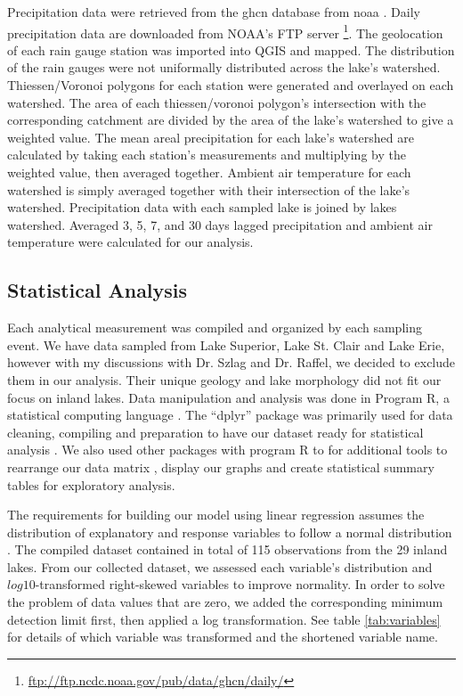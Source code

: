 Precipitation data were retrieved from the \gls{ghcn} database from \gls{noaa} \cite{menne_global_2012}. Daily precipitation data are downloaded from NOAA's FTP server \footnote{\url{ftp://ftp.ncdc.noaa.gov/pub/data/ghcn/daily/}}.  The geolocation of each rain gauge station was imported into QGIS and mapped. The distribution of the rain gauges were not uniformally distributed across the lake's watershed. Thiessen/Voronoi polygons for each station were generated and overlayed on each watershed. The area of each thiessen/voronoi polygon's intersection with the corresponding catchment are divided by the area of the lake's watershed to give a weighted value. The mean areal precipitation for each lake's watershed are calculated by taking each station's measurements and multiplying by the weighted value, then averaged together.  Ambient air temperature for each watershed is simply averaged together with their intersection of the lake's watershed. Precipitation data with each sampled lake is joined by lakes watershed. Averaged 3, 5, 7, and 30 days lagged precipitation and ambient air temperature were calculated for our analysis.

\subsection{Statistical Analysis}

Each analytical measurement was compiled and organized by each sampling event. We have data sampled from Lake Superior, Lake St. Clair and Lake Erie, however with my discussions with Dr. Szlag and Dr. Raffel, we decided to exclude them in our analysis.  Their unique geology and lake morphology did not fit our focus on inland lakes.
Data manipulation and analysis was done in Program R, a statistical computing language \cite{r_core_team_r:_2018}. The ``dplyr'' package was primarily used for data cleaning, compiling and preparation to have our dataset ready for statistical analysis \cite{wickham_dplyr:_2017}. We also used other packages with program R to for additional tools to rearrange our data matrix \cite{robinson_broom:_2018}, display our graphs\cite{wickham_ggplot2:_2009,schloerke_ggally:_2017, garnier_viridis:_2018, wei_r_2017} and create statistical summary tables \cite{leifeld_texreg:_2013,  wickham_tidyverse:_2017, zhu_kableextra:_2018, hlavac_stargazer:_2018, robinson_broom:_2018} for exploratory analysis.

The requirements for building our model using linear regression assumes the distribution of explanatory and response variables to follow a normal distribution \cite{bates_fitting_2015,crawley_r_2007}. The compiled dataset contained in total of 115 observations from the 29 inland lakes.
From our collected dataset, we assessed each variable's distribution and $log10$-transformed right-skewed variables to improve normality. In order to solve the problem of data values that are zero, we added the corresponding minimum detection limit first, then applied a log transformation. See table \ref{tab:variables} for details of which variable was transformed and the shortened variable name.

